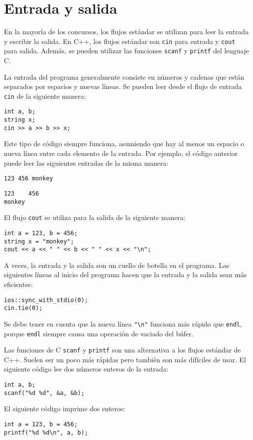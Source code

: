 \section{Entrada y salida}


En la mayoría de los concursos, los flujos estándar se utilizan
para leer la entrada y escribir la salida.
En C++, los flujos estándar son
\texttt{cin} para entrada y \texttt{cout} para salida.
Además, se pueden utilizar las funciones
\texttt{scanf} y \texttt{printf} del lenguaje C.

La entrada del programa generalmente consiste en
números y cadenas que están separados por
espacios y nuevas líneas.
Se pueden leer desde el flujo de entrada \texttt{cin}
de la siguiente manera:

\begin{lstlisting}
int a, b;
string x;
cin >> a >> b >> x;
\end{lstlisting}

Este tipo de código siempre funciona,
asumiendo que hay al menos un espacio
o nueva línea entre cada elemento de la entrada.
Por ejemplo, el código anterior puede leer
las siguientes entradas de la misma manera:
\begin{lstlisting}
123 456 monkey
\end{lstlisting}
\begin{lstlisting}
123    456
monkey
\end{lstlisting}
El flujo \texttt{cout} se utiliza para la salida
de la siguiente manera:
\begin{lstlisting}
int a = 123, b = 456;
string x = "monkey";
cout << a << " " << b << " " << x << "\n";
\end{lstlisting}

A veces, la entrada y la salida
son un cuello de botella en el programa.
Las siguientes líneas al inicio del programa
hacen que la entrada y la salida sean más eficientes:

\begin{lstlisting}
ios::sync_with_stdio(0);
cin.tie(0);
\end{lstlisting}

Se debe tener en cuenta que la nueva línea \texttt{"\textbackslash n"}
funciona más rápido que \texttt{endl},
porque \texttt{endl} siempre causa una
operación de vaciado del búfer.

Las funciones de C \texttt{scanf}
y \texttt{printf} son una alternativa
a los flujos estándar de C++.
Suelen ser un poco más rápidas
pero también son más difíciles de usar.
El siguiente código lee dos números enteros de la entrada:
\begin{lstlisting}
int a, b;
scanf("%d %d", &a, &b);
\end{lstlisting}
El siguiente código imprime dos enteros:
\begin{lstlisting}
int a = 123, b = 456;
printf("%d %d\n", a, b);
\end{lstlisting}

